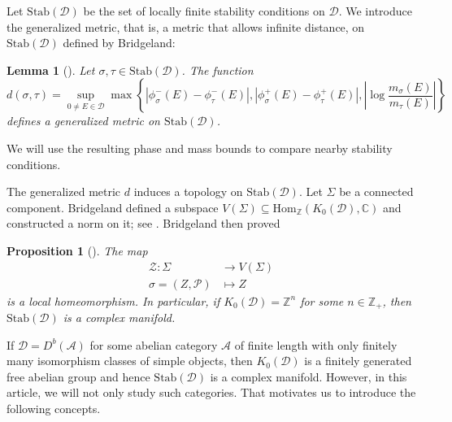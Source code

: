 \documentclass[a4paper,12pt]{amsart}
\numberwithin{equation}{section}
\newtheorem{lemma}[theorem]{Lemma}
\newtheorem{proposition}[theorem]{Proposition}
\newcommand{\Hom}{\mathrm{Hom}}
\newcommand{\Stab}{\mathrm{Stab}}
\newcommand{\1}{\mathbf{1}}
\begin{document}
Let $\Stab(\mathcal{D})$ be the set of locally finite stability conditions on $\mathcal{D}$. We introduce the generalized metric, that is, a metric that allows infinite distance, on $\Stab(\mathcal{D})$ defined by Bridgeland:
\begin{lemma}[{\cite[Proposition 8.1]{Bri2007}}]
    Let $\sigma,\tau\in\Stab(\mathcal{D})$. The function
    \[d(\sigma,\tau)=\sup_{0\neq E\in\mathcal{D}}\max\left\{|\phi_\sigma^-(E)-\phi_\tau^-(E)|,|\phi_\sigma^+(E)-\phi_\tau^+(E)|,\left|\log\dfrac{m_\sigma(E)}{m_\tau(E)}\right|\right\}\]
    defines a generalized metric on $\Stab(\mathcal{D})$.
\end{lemma}
We will use the resulting phase and mass bounds to compare nearby stability conditions.

The generalized metric $d$ induces a topology on $\Stab(\mathcal{D})$. Let $\Sigma$ be a connected component. Bridgeland defined a subspace $V(\Sigma)\subseteq\Hom_{\mathbb{Z}}(K_0(\mathcal{D}),\mathbb{C})$ and constructed a norm on it; see \cite[Section 6]{Bri2007}. Bridgeland then proved
\begin{proposition}[{\cite[Theorem 1.2]{Bri2007}}]\label{deformation}
    The map
    \begin{align*}
        \mathcal{Z}:\Sigma&\rightarrow V(\Sigma)\\
        \sigma=(Z,\mathcal{P})&\mapsto Z
    \end{align*}
    is a local homeomorphism. In particular, if $K_0(\mathcal{D})=\mathbb{Z}^n$ for some $n\in\mathbb{Z}_+$, then $\Stab(\mathcal{D})$ is a complex manifold.
\end{proposition}
If $\mathcal{D}=D^b(\mathcal{A})$ for some abelian category $\mathcal{A}$ of finite length with only finitely many isomorphism classes of simple objects, then $K_0(\mathcal{D})$ is a finitely generated free abelian group and hence $\Stab(\mathcal{D})$ is a complex manifold. However, in this article, we will not only study such categories. That motivates us to introduce the following concepts.
\end{document}
